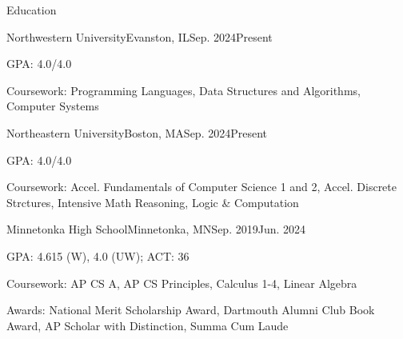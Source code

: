 \documentclass{resume} %
\begin{document}

\begin{rSection}{Education}
  \begin{rItem}{Northwestern University}{Evanston, IL}{Sep. 2024}{Present}
    \item GPA: 4.0/4.0
    \item Coursework: Programming Languages, Data Structures and Algorithms, Computer Systems
  \end{rItem}

  \begin{rItem}{Northeastern University}{Boston, MA}{Sep. 2024}{Present}
    \item GPA: 4.0/4.0
    \item Coursework: Accel. Fundamentals of Computer Science 1 and 2, Accel. Discrete Strctures, Intensive Math Reasoning, Logic \& Computation
  \end{rItem}

  \begin{rItem}{Minnetonka High School}{Minnetonka, MN}{Sep. 2019}{Jun. 2024}
    \item GPA: 4.615 (W), 4.0 (UW); ACT: 36
    \item Coursework: AP CS A, AP CS Principles, Calculus 1-4, Linear Algebra
    \item Awards: National Merit Scholarship Award, Dartmouth Alumni Club Book Award, AP Scholar with Distinction, Summa Cum Laude
  \end{rItem}
\end{rSection}

\end{document}
